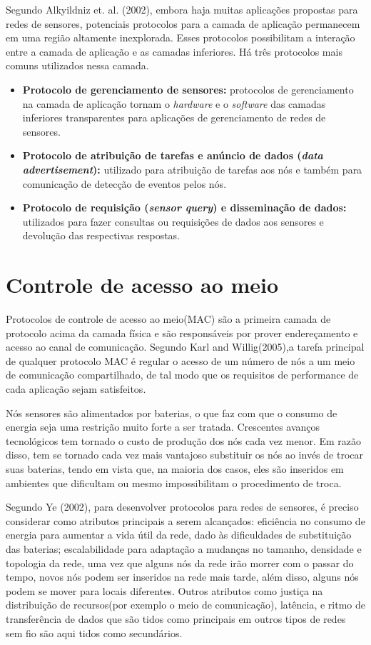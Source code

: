 Segundo Alkyildniz et. al. (2002), embora haja muitas aplicações propostas para redes de sensores, potenciais protocolos para a camada de aplicação permanecem em uma região altamente inexplorada. Esses protocolos possibilitam a interação entre a camada de aplicação e as camadas inferiores. Há três protocolos mais comuns utilizados nessa camada. 
 
 \begin{itemize}
 \item \textbf{Protocolo de gerenciamento de sensores:} protocolos de gerenciamento na camada de aplicação tornam o \textit{hardware} e o \textit{software} das camadas inferiores transparentes para aplicações de gerenciamento de redes de sensores.
 \item \textbf{Protocolo de atribuição de tarefas e anúncio de dados (\textit{data advertisement}):} utilizado para atribuição de tarefas aos nós e também para comunicação de detecção de eventos pelos nós.
 \item \textbf{Protocolo de requisição (\textit{sensor query}) e disseminação de dados:} utilizados para fazer consultas ou requisições de dados aos sensores e devolução das respectivas respostas.
 \end{itemize}


\section{Controle de acesso ao meio}
\label{sec:macProtocols}

Protocolos de controle de acesso ao meio(MAC) são a primeira camada de protocolo acima da camada física e são responsáveis por prover endereçamento e acesso ao canal de comunicação. Segundo Karl and Willig(2005)\cite{Karl2005},a tarefa principal de qualquer protocolo MAC é regular o acesso de um número de nós a um meio de comunicação compartilhado, de tal modo que os requisitos de performance de cada aplicação sejam satisfeitos.

Nós sensores são alimentados por baterias, o que faz com que o consumo de energia seja uma restrição muito forte a ser tratada. Crescentes avanços tecnológicos tem tornado o custo de produção dos nós cada vez menor. Em razão disso, tem se tornado cada vez mais vantajoso substituir os nós ao invés de trocar suas baterias, tendo em vista que, na maioria dos casos, eles são inseridos em ambientes que dificultam ou mesmo impossibilitam o procedimento de troca. 

Segundo Ye (2002)\cite{Ye2002}, para desenvolver protocolos para redes de sensores, é preciso considerar como atributos principais a serem alcançados: eficiência no consumo de energia para aumentar a vida útil da rede, dado às dificuldades de substituição das baterias; escalabilidade para adaptação a mudanças no tamanho, densidade e topologia da rede, uma vez que alguns nós da rede irão morrer com o passar do tempo, novos nós podem ser inseridos na rede mais tarde, além disso, alguns nós podem se mover para locais diferentes. Outros atributos como justiça na distribuição de recursos(por exemplo o meio de comunicação), latência, e ritmo de transferência de dados que são tidos como principais em outros tipos de redes sem fio são aqui tidos como secundários.


